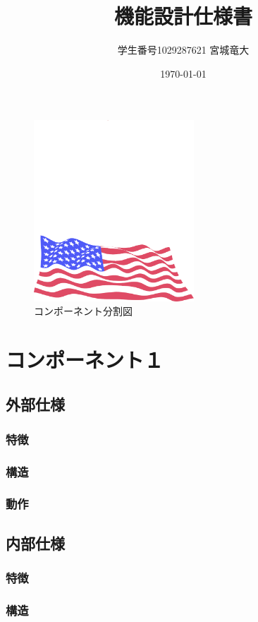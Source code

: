 \documentclass{jsreport}
\title{機能設計仕様書}
\author{学生番号1029287621 宮城竜大}
\date{\today}
\begin{document}
\maketitle
\clearpage

\begin{figure}[htbp]
  \begin{center}
    \includegraphics[width=60mm]{figures/Sample.png}
    \caption{コンポーネント分割図}
  \end{center}
\end{figure}


\section{コンポーネント１}
	\subsection{外部仕様}
        \subsubsection{特徴}
        \subsubsection{構造}
        \subsubsection{動作}

    \subsection{内部仕様}
        \subsubsection{特徴}
        \subsubsection{構造}
\end{document}
